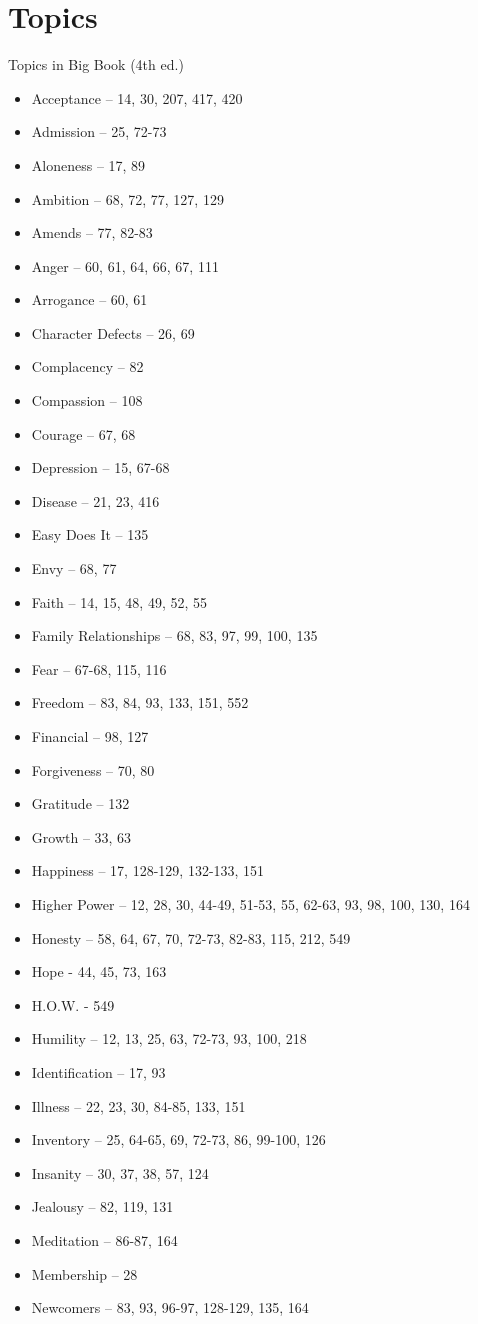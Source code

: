 \documentclass{beamer}
\begin{document}
    \section*{Topics}
    \begin{frame}{Topics in Big Book (4th ed.)}
\begin{itemize}%
\item Acceptance – 14, 30, 207, 417, 420 \item Admission – 25, 72-73 \item Aloneness – 17, 89 \item Ambition – 68, 72, 77, 127, 129 \item Amends – 77, 82-83 \item Anger – 60, 61, 64, 66, 67, 111 \item Arrogance – 60, 61 \item Character Defects – 26, 69 \item Complacency – 82 \item Compassion – 108 \item Courage – 67, 68 \item Depression – 15, 67-68 \item Disease – 21, 23, 416 \item Easy Does It –  135 \item Envy – 68, 77 \item Faith – 14, 15, 48, 49, 52, 55\item Family Relationships – 68, 83, 97, 99, 100, 135\item Fear – 67-68, 115, 116 \item Freedom – 83, 84, 93, 133, 151, 552\item Financial – 98, 127\item Forgiveness – 70, 80 \item Gratitude – 132 \item Growth – 33, 63 \item Happiness – 17, 128-129, 132-133, 151\item Higher Power – 12, 28, 30, 44-49, 51-53, 55, 62-63, 93, 98, 100, 130, 164\item Honesty – 58, 64, 67, 70, 72-73, 82-83, 115, 212, 549\item Hope - 44, 45, 73, 163\item H.O.W. - 549\item Humility – 12, 13, 25, 63, 72-73, 93, 100, 218 \item Identification – 17, 93\item Illness – 22, 23, 30, 84-85, 133, 151\item Inventory – 25, 64-65, 69, 72-73, 86, 99-100, 126\item Insanity – 30, 37, 38, 57, 124\item Jealousy – 82, 119, 131\item Meditation – 86-87, 164\item Membership – 28\item Newcomers – 83, 93, 96-97, 128-129, 135, 164 

\end{itemize}
\end{frame}
\end{document}
